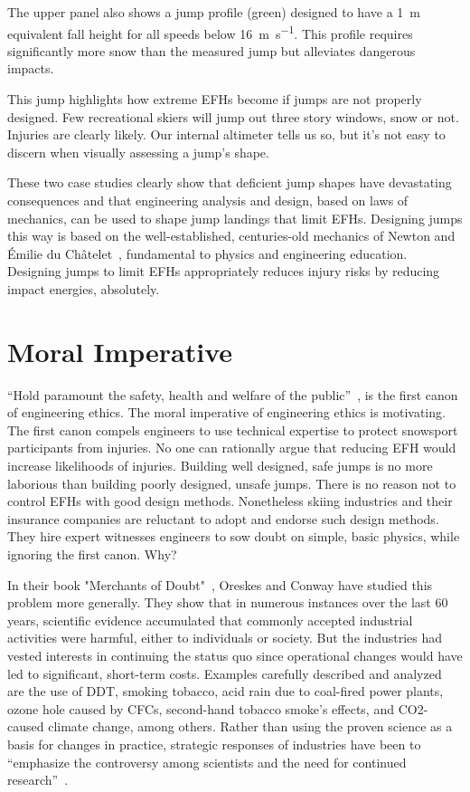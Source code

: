 \documentclass[smallextended]{svjour3}       %
\begin{document}
The upper panel also shows a jump profile (green) designed to have a
1~\si{\meter} equivalent fall height for all speeds below
16~\si{\meter\per\second}. This profile requires significantly more snow than
the measured jump but alleviates dangerous impacts.

This jump highlights how extreme EFHs become if jumps are not properly
designed. Few recreational skiers will jump out three story windows, snow or
not. Injuries are clearly likely.  Our internal altimeter tells us so, but it's
not easy to discern when visually assessing a jump's shape.

These two case studies clearly show that deficient jump shapes have devastating
consequences and that engineering analysis and design, based on laws of
mechanics, can be used to shape jump landings that limit EFHs. Designing jumps
this way is based on the well-established, centuries-old mechanics of Newton
and Émilie du Châtelet~\cite{Zinsser2007}, fundamental to physics and
engineering education. Designing jumps to limit EFHs appropriately reduces
injury risks by reducing impact energies, absolutely.

\section{Moral Imperative}
\label{sec:moral}
%
``Hold paramount the safety, health and welfare of the
public''~\cite{NSPE2019}, is the first canon of engineering ethics. The moral
imperative of engineering ethics is motivating. The first canon compels
engineers to use technical expertise to protect snowsport participants
from injuries. No one can rationally argue that reducing EFH would increase
likelihoods of injuries. Building well designed, safe jumps is no more
laborious than building poorly designed, unsafe jumps. There is no reason not
to control EFHs with good design methods. Nonetheless skiing industries and
their insurance companies are reluctant to adopt and endorse such design
methods. They hire expert witnesses engineers to sow doubt on simple, basic
physics, while ignoring the first canon. Why?

In their book "Merchants of Doubt"~\cite{Oreskes2010}, Oreskes and Conway have studied this problem more generally.
They show that in numerous instances over the last 60 years, scientific evidence accumulated 
that commonly accepted industrial activities were harmful, either to individuals or
society. But the industries had vested interests in continuing the status quo since
operational changes would have led to significant, short-term costs. Examples carefully described and analyzed ~\cite{Oreskes2010} are the use of DDT, smoking tobacco, acid rain 
due to coal-fired power plants, ozone hole caused by CFCs, second-hand tobacco
smoke’s effects, and CO2-caused climate change, among others. Rather than using
the proven science as a basis for changes in practice, strategic responses of
industries have been to “emphasize the controversy among scientists and the
need for continued research”~\cite{Oreskes2010}. 
\end{document}
